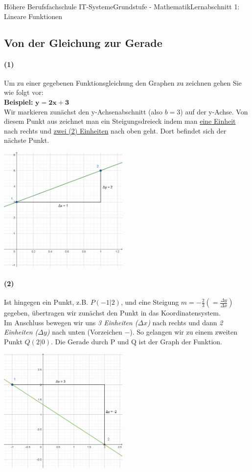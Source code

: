 \documentclass[11pt,twocolumn,oneside,openany,headings=optiontotoc,11pt,numbers=noenddot]{article}
\begin{document}
\begin{worksheet}{Höhere Berufsfachschule IT-Systeme}{Grundstufe - 
		Mathematik}{Lernabschnitt 1: Lineare Funktionen}
		\subsection{Von der Gleichung zur Gerade}
		\paragraph{(1)} Um zu einer gegebenen Funktionsgleichung den Graphen zu zeichnen gehen Sie wie folgt vor:\\
		\textbf{Beispiel:} \(\mathbf{y = 2x + 3}\)\\
		Wir markieren zunächst den y-Achsenabschnitt (also \(b = 3\)) auf der y-Achse. Von diesem Punkt aus zeichnet man ein Steigungsdreieck indem man \underline{eine Einheit} nach rechts und \underline{zwei (2) Einheiten} nach oben geht. Dort befindet sich der nächste Punkt.\\
		\par\noindent
		\includegraphics[width=0.48\textwidth]{../99_Bilder/FzG1.png}\\
		\paragraph{(2)} Ist hingegen ein Punkt, z.B. \(P(-1|2)\), und eine Steigung \(m=-\frac{2}{3} (=\frac{\Delta{}y}{\Delta{}x})\) gegeben, übertragen wir zunächst den Punkt in das Koordinatensystem.\\
		Im Anschluss bewegen wir uns \textit{3 Einheiten (\(\Delta{}x\))} nach rechts und dann \textit{2 Einheiten (\(\Delta{}y\))} nach unten (Vorzeichen \(-\)). So gelangen wir zu einem zweiten Punkt \(Q(2|0)\). Die Gerade durch P und Q ist der Graph der Funktion.\\
		\par\noindent
		\includegraphics[width=0.48\textwidth]{../99_Bilder/FzG2.png}

\end{worksheet}
\end{document}
